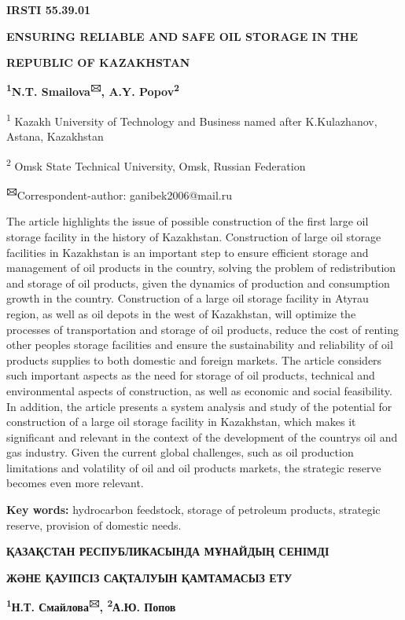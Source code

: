 
\newpage
{\bfseries IRSTI 55.39.01}

{\bfseries ENSURING RELIABLE AND SAFE OIL STORAGE IN THE}

{\bfseries REPUBLIC OF KAZAKHSTAN}

{\bfseries \textsuperscript{1}N.T. Smailova\textsuperscript{🖂}, A.Y.
Popov\textsuperscript{2}}

\textsuperscript{1} Kazakh University of Technology and Business named
after K.Kulazhanov, Astana, Kazakhstan

\textsuperscript{2} Omsk State Technical University, Omsk, Russian
Federation

{\bfseries \textsuperscript{🖂}}Correspondent-author: ganibek2006@mail.ru

The article highlights the issue of possible construction of the first
large oil storage facility in the history of Kazakhstan. Construction of
large oil storage facilities in Kazakhstan is an important step to
ensure efficient storage and management of oil products in the country,
solving the problem of redistribution and storage of oil products, given
the dynamics of production and consumption growth in the country.
Construction of a large oil storage facility in Atyrau region, as well
as oil depots in the west of Kazakhstan, will optimize the processes of
transportation and storage of oil products, reduce the cost of renting
other people\textquotesingle s storage facilities and ensure the
sustainability and reliability of oil products supplies to both domestic
and foreign markets. The article considers such important aspects as the
need for storage of oil products, technical and environmental aspects of
construction, as well as economic and social feasibility. In addition,
the article presents a system analysis and study of the potential for
construction of a large oil storage facility in Kazakhstan, which makes
it significant and relevant in the context of the development of the
country\textquotesingle s oil and gas industry. Given the current global
challenges, such as oil production limitations and volatility of oil and
oil products markets, the strategic reserve becomes even more relevant.

{\bfseries Key words:} hydrocarbon feedstock, storage of petroleum
products, strategic reserve, provision of domestic needs.

{\bfseries ҚАЗАҚСТАН РЕСПУБЛИКАСЫНДА МҰНАЙДЫҢ СЕНІМДІ}

{\bfseries ЖӘНЕ ҚАУІПСІЗ САҚТАЛУЫН ҚАМТАМАСЫЗ ЕТУ}

{\bfseries \textsuperscript{1}Н.Т. Смайлова\textsuperscript{🖂},
\textsuperscript{2}А.Ю. Попов}

